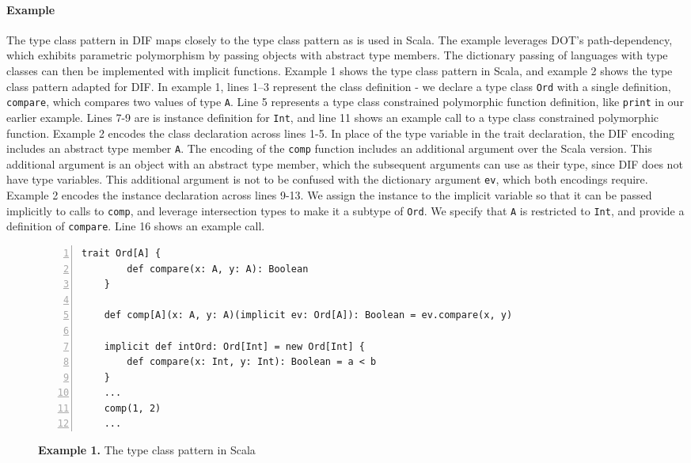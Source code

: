 \paragraph{Example} The type class pattern \cite{OBLB18} in DIF maps closely to
the type class pattern as is used in Scala. The example leverages DOT's
path-dependency, which exhibits parametric polymorphism by passing objects with
abstract type members. The dictionary passing of languages with type classes can
then be implemented with implicit functions. Example 1 shows the type class
pattern in Scala, and example 2 shows the type class pattern adapted for DIF. In
example 1, lines 1--3 represent the class definition - we declare a type class
\texttt{Ord} with a single definition, \texttt{compare}, which compares two
values of type \texttt{A}. Line 5 represents a type class constrained
polymorphic function definition, like \texttt{print} in our earlier example.
Lines 7-9 are is instance definition for \texttt{Int}, and line 11 shows an
example call to a type class constrained polymorphic function. Example 2 encodes
the class declaration across lines 1-5. In place of the type variable in the
trait declaration, the DIF encoding includes an abstract type member \texttt{A}.
The encoding of the \texttt{comp} function includes an additional argument over
the Scala version. This additional argument is an object with an abstract type
member, which the subsequent arguments can use as their type, since DIF does not
have type variables. This additional argument is not to be confused with the
dictionary argument \texttt{ev}, which both encodings require. Example 2 encodes
the instance declaration across lines 9-13. We assign the instance to the
implicit variable so that it can be passed implicitly to calls to \texttt{comp},
and leverage intersection types to make it a subtype of \texttt{Ord}. We specify
that \texttt{A} is restricted to \texttt{Int}, and provide a definition of
\texttt{compare}. Line 16 shows an example call.

\begin{figure*}[h]
\begin{lstlisting}[mathescape,numbers=left]
    trait Ord[A] {
        def compare(x: A, y: A): Boolean
    }

    def comp[A](x: A, y: A)(implicit ev: Ord[A]): Boolean = ev.compare(x, y)

    implicit def intOrd: Ord[Int] = new Ord[Int] {
        def compare(x: Int, y: Int): Boolean = a < b
    }
    ...
    comp(1, 2)
    ...
\end{lstlisting}
\caption*{\textbf{Example 1.} The type class pattern in Scala}
\end{figure*}

